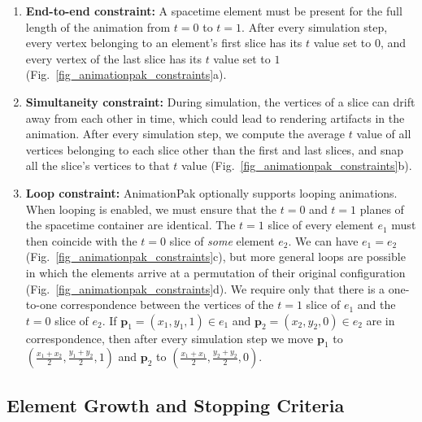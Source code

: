 \begin{enumerate}
\item \textbf{End-to-end constraint:}
A spacetime element must be present for the full length of the animation
from $t=0$ to $t=1$.  After every simulation step, every vertex belonging
to an element's first slice has its $t$ value set to $0$, and every vertex
of the last slice has its $t$ value set to $1$
(Fig.~\ref{fig_animationpak_constraints}a).

\item \textbf{Simultaneity constraint:}
During simulation, the vertices of a slice can drift away from each
other in time, which could lead to rendering artifacts in the animation.
After every simulation step, we compute the average $t$ value of all
vertices belonging to each slice other than the first and last slices, and 
snap all the slice's vertices to that $t$ value 
(Fig.~\ref{fig_animationpak_constraints}b).

\item \textbf{Loop constraint:}
AnimationPak optionally supports looping animations.
When looping is enabled, we must ensure that the $t=0$ and $t=1$ planes
of the spacetime container are identical.  
The $t=1$ slice of every element $e_1$ must then 
coincide with the $t=0$ slice of \textit{some} 
element $e_2$.  We can have $e_1=e_2$ 
(Fig.~\ref{fig_animationpak_constraints}c), but more general loops are possible in which
the elements arrive at a permutation of their original configuration
(Fig.~\ref{fig_animationpak_constraints}d).  We require only that there is a one-to-one
correspondence between the vertices of the $t=1$ slice of $e_1$ and the
$t=0$ slice of $e_2$.  If $\bm{p}_1=(x_1,y_1,1)\in e_1$ and
$\bm{p}_2=(x_2,y_2,0)\in e_2$
are in correspondence, then after every simulation step we
move $\bm{p}_1$ to $(\frac{x_1+x_2}{2},\frac{y_1+y_2}{2},1)$ and
$\bm{p}_2$ to $(\frac{x_1+x_1}{2},\frac{y_2+y_2}{2},0)$.
\end{enumerate}


\subsection{Element Growth and Stopping Criteria}
\label{animationpak_element_growth_and_stopping_criteria}

